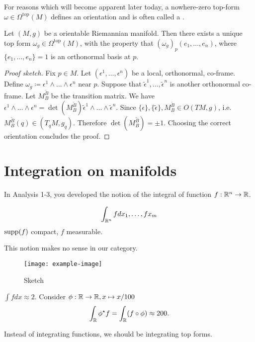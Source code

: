 For reasons which will become apparent later today, a nowhere-zero top-form \(\omega\in\Omega^{\text{top}}(M)\)
defines an orientation and is often called a .

\begin{lemma}\label{lem:11.5}
    Let \((M,g)\) be a orientable Riemannian manifold. Then there exists a unique top form 
    \(\omega_g\in\Omega^{\text{top}}(M)\), with the property that \((\omega_g)_p(e_1,\dots,e_n)\), where \(\{e_1,\dots,e_n\}=1\) is an orthonormal basis at \(p\).
\end{lemma}

\begin{proof}[Proof sketch]
    Fix \(p\in M\). Let \((\epsilon^1,\dots,\epsilon^n)\) be a local, orthonormal, co-frame. Define 
    \(\omega_g\coloneqq \epsilon^1\wedge\dots\wedge \epsilon^n\) near \(p\). Suppose that 
    \(\tilde{\epsilon}^1,\dots,\tilde{\epsilon}^n\) is another orthonormal co-frame. Let \(M_{B}^{\tilde{B}}\)
    be the transition matrix. We have \(\epsilon^{1}\wedge \dots\wedge \epsilon^n=\det(M_{B}^{\tilde{B}})\tilde{\epsilon}^1\wedge\dots\wedge\tilde{\epsilon}^n\). Since 
    \(\{\epsilon\},\{\tilde{\epsilon}\},M_B^{\tilde{B}}\in O(TM,g)\), i.e. \(M_B^{\tilde{B}}(q)\in (T_q M, g_q)\).
    Therefore \(\det(M_{B}^{\tilde{B}})=\pm1\). Choosing the correct orientation concludes the proof.
\end{proof}

\section{Integration on manifolds}

In Analysis 1-3, you developed the notion of the integral of function \(f:\mathbb{R}^n\to \mathbb{R}\).

\[\int_{\mathbb{R}^n} fdx_1,\dots,fx_m\]
\(\text{supp}(f)\) compact, \(f\) measurable.

 This notion makes no sense in our category.

\begin{example}
    \begin{figure}[H]\label{fig:11.}
        \centering
        \texttt{[image: example-image]}
        \caption{Sketch }
    \end{figure}
    \(\int fdx\approx 2\). Consider \(\phi:\mathbb{R}\to\mathbb{R},x\mapsto x/100\)
    \[\int_{\mathbb{R}} \phi^\star f=\int_{\mathbb{R}} (f\circ \phi)\approx 200.\]
\end{example}
 Instead of integrating functions, we should be integrating top forms.

